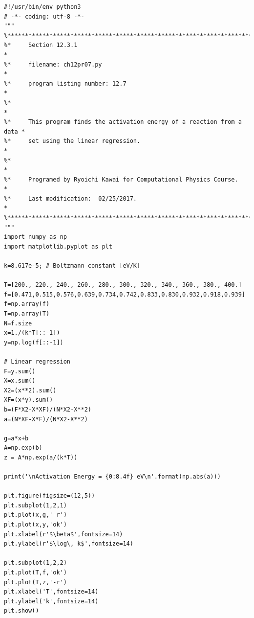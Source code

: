 \bigskip
\noindent
\program
\footnotesize
\begin{verbatim}
#!/usr/bin/env python3
# -*- coding: utf-8 -*-
"""
%**************************************************************************
%*     Section 12.3.1                                                     *
%*     filename: ch12pr07.py                                               *
%*     program listing number: 12.7                                       *
%*                                                                        *
%*     This program finds the activation energy of a reaction from a data *
%*     set using the linear regression.                                   *
%*                                                                        *
%*     Programed by Ryoichi Kawai for Computational Physics Course.       *
%*     Last modification:  02/25/2017.                                     *
%**************************************************************************
"""
import numpy as np
import matplotlib.pyplot as plt

k=8.617e-5; # Boltzmann constant [eV/K]

T=[200., 220., 240., 260., 280., 300., 320., 340., 360., 380., 400.]
f=[0.471,0.515,0.576,0.639,0.734,0.742,0.833,0.830,0.932,0.918,0.939]
f=np.array(f)
T=np.array(T)
N=f.size
x=1./(k*T[::-1])   
y=np.log(f[::-1])

# Linear regression
F=y.sum()
X=x.sum()
X2=(x**2).sum()
XF=(x*y).sum()
b=(F*X2-X*XF)/(N*X2-X**2)
a=(N*XF-X*F)/(N*X2-X**2)

g=a*x+b
A=np.exp(b)
z = A*np.exp(a/(k*T))

print('\nActivation Energy = {0:8.4f} eV\n'.format(np.abs(a)))

plt.figure(figsize=(12,5))
plt.subplot(1,2,1)
plt.plot(x,g,'-r')
plt.plot(x,y,'ok')
plt.xlabel(r'$\beta$',fontsize=14)
plt.ylabel(r'$\log\, k$',fontsize=14)

plt.subplot(1,2,2)
plt.plot(T,f,'ok')
plt.plot(T,z,'-r')
plt.xlabel('T',fontsize=14)
plt.ylabel('k',fontsize=14)
plt.show()
\end{verbatim}
\normalsize


